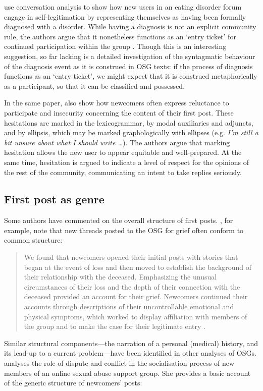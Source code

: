 \documentclass{article}
\begin{document}
\textcite{stommel_use_2011} use conversation analysis to show how new users in an eating disorder forum engage in self-legitimation by representing themselves as having been formally diagnosed with a disorder. While having a diagnosis is not an explicit community rule, the authors argue that it nonetheless functions as an `entry ticket' for continued participation within the group \parencite*[p.~6]{stommel_use_2011}. Though this is an interesting suggestion, so far lacking is a detailed investigation of the syntagmatic behaviour of the diagnosis event as it is construed in OSG texts: if the process of diagnosis functions as an `entry ticket', we might expect that it is construed metaphorically as a participant, so that it can be classified and possessed.

In the same paper, \citeauthor{stommel_use_2011} also show how newcomers often express reluctance to participate and insecurity concerning the content of their first post. These hesitations are marked in  the lexicogrammar, by modal auxiliaries and adjuncts, and by ellipsis, which may be marked graphologically with ellipses (e.g. \emph{I'm still a bit unsure about what I should write \dots}). The authors argue that marking hesitation allows the new user to appear equitable and well-prepared. At the same time, hesitation is argued to indicate a level of respect for the opinions of the rest of the community, communicating an intent to take replies seriously. 

\subsection{First post as genre}

Some authors have commented on the overall structure of first posts. \textcite{varga2014grieving}, for example, note that new threads posted to the OSG for grief often conform to common structure:

\begin{quote}\small\singlespacing
We found that newcomers opened their initial posts with stories that began at the event of loss and then moved to establish the background of their relationship with the deceased. Emphasizing the unusual circumstances of their loss and the depth of their connection with the deceased provided an account for their grief. Newcomers continued their accounts through descriptions of their uncontrollable emotional and physical symptoms, which worked to display affiliation with members of the group and to make the case for their legitimate entry \parencite*[p.~5]{varga2014grieving}. 
\end{quote}
%
%
Similar structural components---the narration of a personal (medical) history, and its lead-up to a current problem---have been identified in other analyses of OSGs. \textcite[p.~4]{weber_missed_2011} analyses the role of dispute and conflict in the socialisation process of new members of an online sexual abuse support group. She provides a basic account of the generic structure of newcomers' posts:
\end{document}
